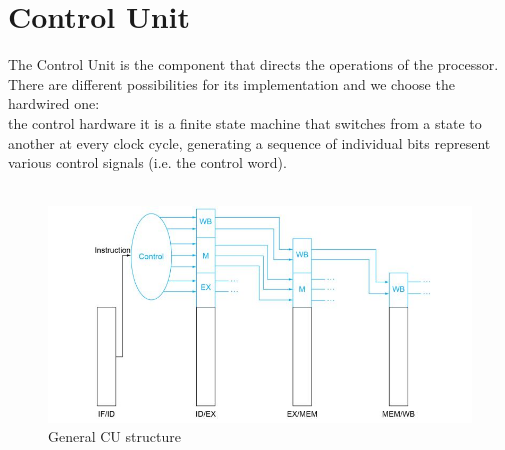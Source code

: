 \chapter{Control Unit}
The Control Unit is the component that directs the operations of the processor. \\
There are different possibilities for its implementation and we choose the hardwired one: \\
the control hardware it is a finite state machine that switches from a state to another at every clock cycle, generating a sequence of individual bits represent various control signals (i.e. the control word). \\
\\
\begin{figure}[h!]
	\centering
	\includegraphics[width=12cm]{./images/structure_CU}
	\caption{General CU structure}
	\label{fig3.1}
\end{figure}

